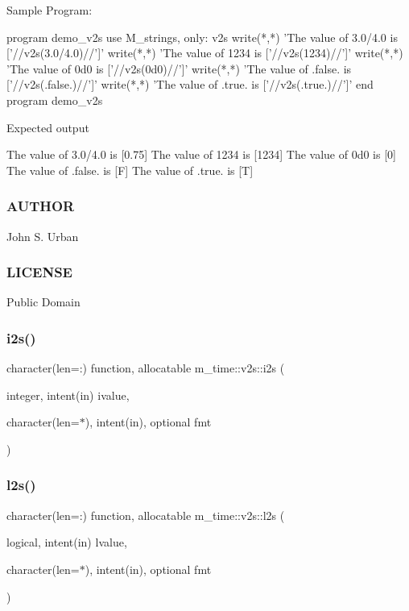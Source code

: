 \begin{DoxyVerb}Sample Program:

 program demo_v2s
 use M_strings, only: v2s
 write(*,*) 'The value of 3.0/4.0 is ['//v2s(3.0/4.0)//']'
 write(*,*) 'The value of 1234    is ['//v2s(1234)//']'
 write(*,*) 'The value of 0d0     is ['//v2s(0d0)//']'
 write(*,*) 'The value of .false. is ['//v2s(.false.)//']'
 write(*,*) 'The value of .true. is  ['//v2s(.true.)//']'
 end program demo_v2s

Expected output

 The value of 3.0/4.0 is [0.75]
 The value of 1234    is [1234]
 The value of 0d0     is [0]
 The value of .false. is [F]
 The value of .true. is  [T]
\end{DoxyVerb}


\subsubsection*{A\+U\+T\+H\+OR}

John S. Urban \subsubsection*{L\+I\+C\+E\+N\+SE}

Public Domain \mbox{\label{interfacem__time_1_1v2s_aa950b277049afb5e6dac9c55c78d9539}} 
\subsubsection{\texorpdfstring{i2s()}{i2s()}}
{\footnotesize\ttfamily character(len=\+:) function, allocatable m\+\_\+time\+::v2s\+::i2s (\begin{DoxyParamCaption}\item[{integer, intent(in)}]{ivalue,  }\item[{character(len=$\ast$), intent(in), optional}]{fmt }\end{DoxyParamCaption})\hspace{0.3cm}{\ttfamily [private]}}

\mbox{\label{interfacem__time_1_1v2s_a6daa793a11022426b014474553d812c5}} 
\subsubsection{\texorpdfstring{l2s()}{l2s()}}
{\footnotesize\ttfamily character(len=\+:) function, allocatable m\+\_\+time\+::v2s\+::l2s (\begin{DoxyParamCaption}\item[{logical, intent(in)}]{lvalue,  }\item[{character(len=$\ast$), intent(in), optional}]{fmt }\end{DoxyParamCaption})\hspace{0.3cm}{\ttfamily [private]}}

